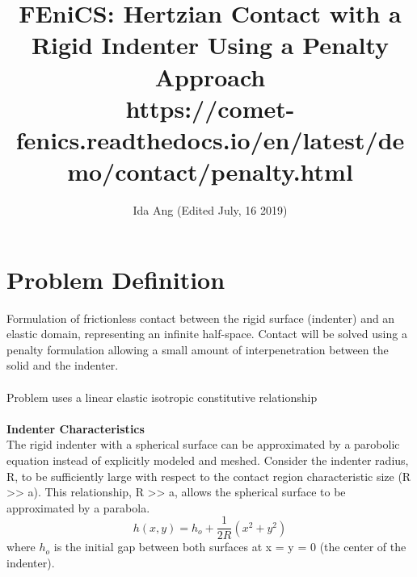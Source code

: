 \documentclass[12pt,3p]{article}
\begin{document}
\title{FEniCS: Hertzian Contact with a Rigid Indenter Using a Penalty Approach \\
	\large{https://comet-fenics.readthedocs.io/en/latest/demo/contact/penalty.html}}
\author{Ida Ang (Edited July, 16 2019)}
\date{\vspace{-5ex}}
\maketitle

\section{Problem Definition}
Formulation of frictionless contact between the rigid surface (indenter) and an elastic domain, representing an infinite half-space. Contact will be solved using a penalty formulation allowing a small amount of interpenetration between the solid and the indenter. \\ \\
Problem uses a linear elastic isotropic constitutive relationship \\ \\
\textbf{Indenter Characteristics} \\
The rigid indenter with a spherical surface can be approximated by a parobolic equation instead of explicitly modeled and meshed. Consider the indenter radius, R, to be sufficiently large with respect to the contact region characteristic size (R >> a). This relationship, R >> a, allows the spherical surface to be approximated by a parabola. 
\begin{equation}\label{indenter}
h(x,y) = h_o + \frac{1}{2R} (x^2 + y^2)
\end{equation}
where $h_o$ is the initial gap between both surfaces at x = y = 0 (the center of the indenter). 
 
\end{document}

